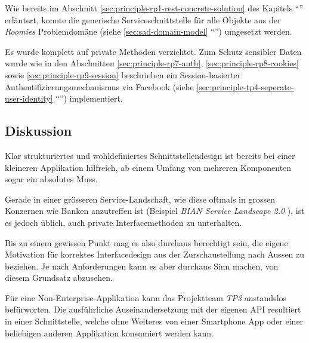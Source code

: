Wie bereits im Abschnitt \ref{sec:principle-rp1-rest-concrete-solution} des Kapitels ``'' erläutert, konnte die generische Serviceschnittstelle für alle Objekte aus der \emph{Roomies} Problemdomäne (siehe \ref{sec:sad-domain-model} ``'') umgesetzt werden.

Es wurde komplett auf private Methoden verzichtet. Zum Schutz sensibler Daten wurde wie in den Abschnitten \ref{sec:principle-rp7-auth}, \ref{sec:principle-rp8-cookies} sowie \ref{sec:principle-rp9-session} beschrieben ein Session-basierter Authentifizierungsmechanismus via Facebook (siehe \ref{sec:principle-tp4-seperate-user-identity} ``'') implementiert.


\subsection*{Diskussion}

Klar strukturiertes und wohldefiniertes Schnittstellendesign ist bereits bei einer kleineren Applikation hilfreich, ab einem Umfang von mehreren Komponenten sogar ein absolutes Muss.

Gerade in einer grösseren Service-Landschaft, wie diese oftmals in grossen Konzernen wie Banken anzutreffen ist (Beispiel \emph{BIAN Service Landscape 2.0} \cite{BIANServiceLandscape}), ist es jedoch üblich, auch private Interfacemethoden zu unterhalten.

Bis zu einem gewissen Punkt mag es also durchaus berechtigt sein, die eigene Motivation für korrektes Interfacedesign aus der Zurschaustellung nach Aussen zu beziehen. Je nach Anforderungen kann es aber durchaus Sinn machen, von diesem Grundsatz abzusehen.

Für eine Non-Enterprise-Applikation kann das Projektteam \emph{TP3} anstandslos befürworten. Die ausführliche Auseinandersetzung mit der eigenen API resultiert in einer Schnittstelle, welche ohne Weiteres von einer Smartphone App oder einer beliebigen anderen Applikation konsumiert werden kann.